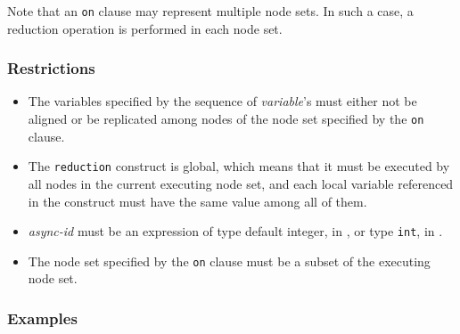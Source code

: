 Note that an {\tt on} clause may represent multiple node sets. In such a
case, a reduction operation is performed in each node set.

\subsubsection*{Restrictions}

\begin{itemize}
 \item The variables specified by the sequence of {\it variable}'s must
       either not be aligned or be replicated among nodes of the node
       set specified by the {\tt on} clause.
 \item The {\tt reduction} construct is global, which means that it must
       be executed by all nodes in the current executing node set, and each local
       variable referenced in the construct must have the same value
       among all of them.
 \item {\it async-id} must be an expression of type default integer, in
       {\XMPF}, or type {\tt int}, in {\XMPC}.
 \item The node set specified by the {\tt on} clause must be a subset of the
       executing node set.
\end{itemize}

\subsubsection*{Examples}

